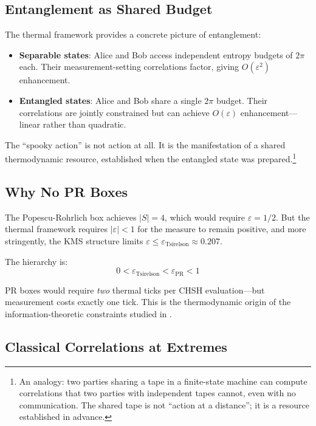\documentclass[12pt,a4paper]{article}
\newcommand{\eps}{\varepsilon}
\begin{document}
\subsection{Entanglement as Shared Budget}

The thermal framework provides a concrete picture of entanglement:

\begin{itemize}
\item \textbf{Separable states}: Alice and Bob access independent entropy budgets of $2\pi$ each. Their measurement-setting correlations factor, giving $O(\eps^2)$ enhancement.

\item \textbf{Entangled states}: Alice and Bob share a single $2\pi$ budget. Their correlations are jointly constrained but can achieve $O(\eps)$ enhancement—linear rather than quadratic.
\end{itemize}

The ``spooky action'' is not action at all. It is the manifestation of a shared thermodynamic resource, established when the entangled state was prepared.\footnote{An analogy: two parties sharing a tape in a finite-state machine can compute correlations that two parties with independent tapes cannot, even with no communication. The shared tape is not ``action at a distance''; it is a resource established in advance.}

\subsection{Why No PR Boxes}

The Popescu-Rohrlich box achieves $|S| = 4$, which would require $\eps = 1/2$. But the thermal framework requires $|\eps| < 1$ for the measure to remain positive, and more stringently, the KMS structure limits $\eps \leq \eps_{\text{Tsirelson}} \approx 0.207$.

The hierarchy is:
\begin{equation}
0 < \eps_{\text{Tsirelson}} < \eps_{\text{PR}} < 1
\end{equation}

PR boxes would require \emph{two} thermal ticks per CHSH evaluation—but measurement costs exactly one tick. This is the thermodynamic origin of the information-theoretic constraints studied in \cite{Pawlowski2009,NavascuesPironio2010}.

\subsection{Classical Correlations at Extremes}
\end{document}
